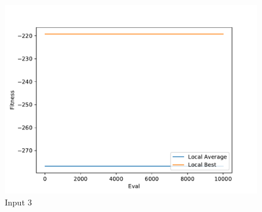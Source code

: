 \documentclass{standalone}
\begin{document}
\begin{figure}[!htb]
	\caption{Input 3}
	\label{fig:graph_3004}
	\includegraphics[width=\textwidth]{../graphs/graphs/3004.pdf}
\end{figure}
\end{document}
